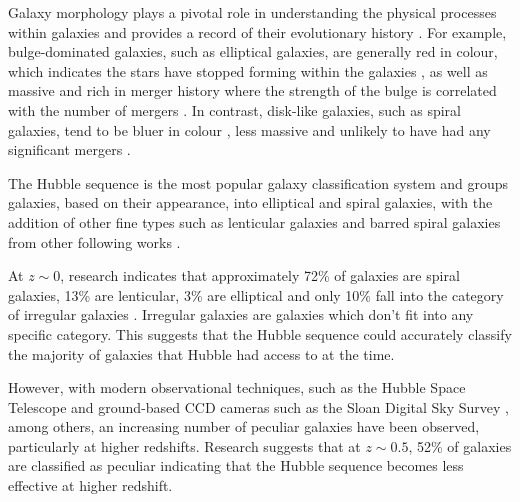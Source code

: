 \documentclass[12pt, onecolumn]{article}
\begin{document}
        Galaxy morphology plays a pivotal role in understanding the physical processes within galaxies and provides a record of their evolutionary history \cite{high_redshift_UL}. For example, bulge-dominated galaxies, such as elliptical galaxies, are generally red in colour, which indicates the stars have stopped forming within the galaxies \cite{elliptical_red_low_sfr}, as well as massive \cite{elliptical_massive} and rich in merger history \cite{bulge_rich_merger_history} where the strength of the bulge is correlated with the number of mergers \cite{bulge_strength_no_mergers}. In contrast, disk-like galaxies, such as spiral galaxies, tend to be bluer in colour \cite{blue_spiral}, less massive \cite{spiral_low_mass} and unlikely to have had any significant mergers \cite{disk_low_mergers}.
        
        The Hubble sequence \cite{original_hubble_sequence} is the most popular galaxy classification system and groups galaxies, based on their appearance, into elliptical and spiral galaxies, with the addition of other fine types such as lenticular galaxies and barred spiral galaxies from other following works \cite{lenticulars} \cite{deVaucouleurs_system}.
        
        At $z \sim 0$, research indicates that approximately 72\% of galaxies are spiral galaxies, 13\% are lenticular, 3\% are elliptical and only 10\% fall into the category of irregular galaxies \cite{hubble_sequence_6_Gyr_ago}. Irregular galaxies are galaxies which don't fit into any specific category. This suggests that the Hubble sequence could accurately classify the majority of galaxies that Hubble had access to at the time. 

        However, with modern observational techniques, such as the Hubble Space Telescope \cite{hst} and ground-based CCD cameras such as the Sloan Digital Sky Survey \cite{sdss}, among others, an increasing number of peculiar galaxies have been observed, particularly at higher redshifts. Research suggests that at $z \sim 0.5$, 52\% of galaxies are classified as peculiar \cite{hubble_sequence_6_Gyr_ago} indicating that the Hubble sequence becomes less effective at higher redshift.
        
\end{document}
